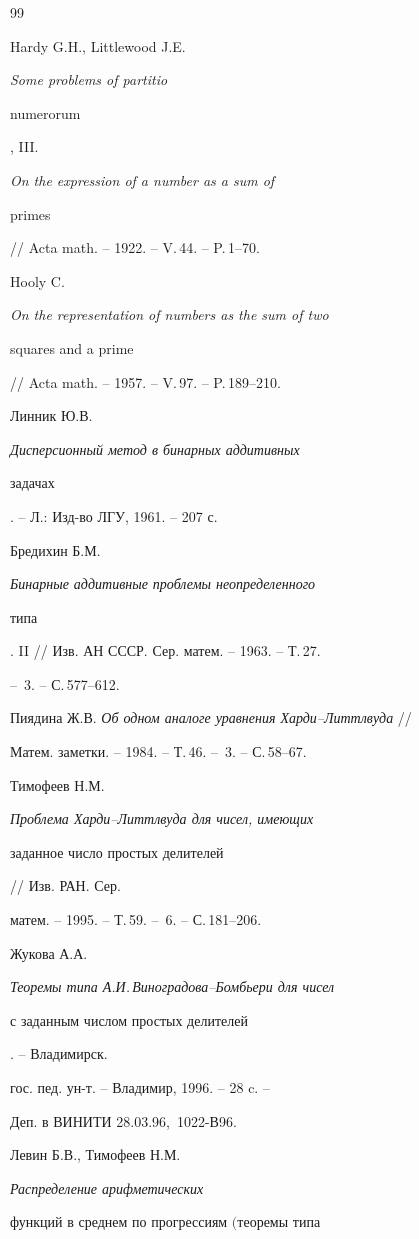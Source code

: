 \begin{thebibliography}{99}




Hardy G.H., Littlewood J.E. {\em Some problems of partitio


numerorum}, III. {\em On the expression of a number as a sum of


primes} // Acta math. -- 1922. -- V.\,44. -- P.\,1--70.




Hooly C. {\em On the representation of numbers as the sum of two


squares and a prime} // Acta math. -- 1957. -- V.\,97. -- P.\,189--210.




Линник Ю.В. {\em Дисперсионный метод в бинарных аддитивных


задачах}. -- Л.: Изд-во ЛГУ, 1961. -- 207 с.




Бредихин Б.М. {\em Бинарные аддитивные проблемы неопределенного


типа}. II // Изв. АН СССР. Сер. матем. -- 1963. -- Т.\,27.


-- \No\,3. -- С.\,577--612.




Пиядина Ж.В. {\em Об одном аналоге уравнения Харди--Литтлвуда} //


Матем. заметки. -- 1984. -- Т.\,46. -- \No\,3. -- С.\,58--67.




Тимофеев Н.М. {\em Проблема Харди--Литтлвуда для чисел, имеющих


заданное число простых делителей} // Изв. РАН. Сер.


матем. -- 1995. -- Т.\,59. -- \No\,6. -- С.\,181--206.




Жукова А.А. {\em Теоремы типа А.И.\,Виноградова--Бомбьери для чисел


с заданным числом простых делителей}. -- Владимирск.


гос. пед. ун-т. -- Владимир, 1996. -- 28 c. --


Деп. в ВИНИТИ 28.03.96, \No\,1022-В96.




Левин Б.В., Тимофеев Н.М. {\em Распределение арифметических


функций в среднем по прогрессиям $($теоремы типа


}
\end{thebibliography}
